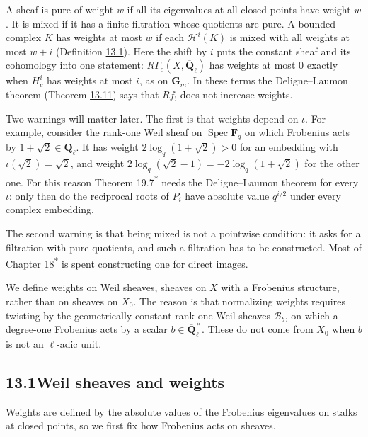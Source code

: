 \documentclass[11pt]{article}
\newcommand{\bpout}[1]{#1\textsuperscript{\hyperlink{bp-outside}{\ensuremath{\ast}}}}
\begin{document}
A sheaf is pure of weight \(w\) if all its eigenvalues at all closed points have weight \(w\). It is mixed if it has a finite filtration whose quotients are pure. A bounded complex \(K\) has weights at most \(w\) if each \(\mathcal H^i(K)\) is mixed with all weights at most \(w+i\) (Definition \hyperref[bp7]{13.1}). Here the shift by \(i\) puts the constant sheaf and its cohomology into one statement: \(R\Gamma_c(X,\overline{\mathbf Q}_\ell)\) has weights at most \(0\) exactly when \(H^i_c\) has weights at most \(i\), as on \(\mathbf G_m\). In these terms the Deligne–Laumon theorem (Theorem \hyperref[bp36]{13.11}) says that \(Rf_!\) does not increase weights.

Two warnings will matter later. The first is that weights depend on \(\iota\). For example, consider the rank-one Weil sheaf on \(\operatorname{Spec}\mathbf F_q\) on which Frobenius acts by \(1+\sqrt2\in\overline{\mathbf Q}_\ell\). It has weight \(2\log_q(1+\sqrt2)>0\) for an embedding with \(\iota(\sqrt2)=\sqrt2\), and weight \(2\log_q(\sqrt2-1)=-2\log_q(1+\sqrt2)\) for the other one. For this reason Theorem \bpout{19.7} needs the Deligne–Laumon theorem for every \(\iota\): only then do the reciprocal roots of \(P_i\) have absolute value \(q^{i/2}\) under every complex embedding.

The second warning is that being mixed is not a pointwise condition: it asks for a filtration with pure quotients, and such a filtration has to be constructed. Most of Chapter \bpout{18} is spent constructing one for direct images.

We define weights on Weil sheaves, sheaves on \(X\) with a Frobenius structure, rather than on sheaves on \(X_0\). The reason is that normalizing weights requires twisting by the geometrically constant rank-one Weil sheaves \(\mathcal B_b\), on which a degree-one Frobenius acts by a scalar \(b\in\overline{\mathbf Q}_\ell^\times\). These do not come from \(X_0\) when \(b\) is not an \(\ell\)-adic unit.

\subsection*{\texorpdfstring{13.1\quad Weil sheaves and weights}{13.1 Weil sheaves and weights}}
\label{bp3}%
\label{bp4}%
Weights are defined by the absolute values of the Frobenius eigenvalues on stalks at closed points, so we first fix how Frobenius acts on sheaves.
\end{document}
